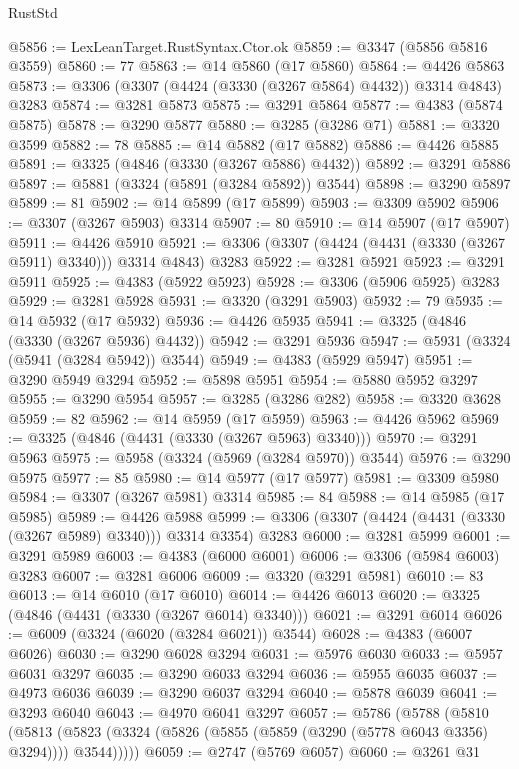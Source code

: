 \begin{lexlean}{RustStd}
\begin{coremodule}
@5856 := LexLeanTarget.RustSyntax.Ctor.ok
@5859 := @3347 (@5856 @5816 @3559)
@5860 := 77
@5863 := @14 @5860 (@17 @5860)
@5864 := @4426 @5863
@5873 := @3306 (@3307 (@4424 (@3330 (@3267 @5864) @4432)) @3314 @4843) @3283
@5874 := @3281 @5873
@5875 := @3291 @5864
@5877 := @4383 (@5874 @5875)
@5878 := @3290 @5877
@5880 := @3285 (@3286 @71)
@5881 := @3320 @3599
@5882 := 78
@5885 := @14 @5882 (@17 @5882)
@5886 := @4426 @5885
@5891 := @3325 (@4846 (@3330 (@3267 @5886) @4432))
@5892 := @3291 @5886
@5897 := @5881 (@3324 (@5891 (@3284 @5892)) @3544)
@5898 := @3290 @5897
@5899 := 81
@5902 := @14 @5899 (@17 @5899)
@5903 := @3309 @5902
@5906 := @3307 (@3267 @5903) @3314
@5907 := 80
@5910 := @14 @5907 (@17 @5907)
@5911 := @4426 @5910
@5921 := @3306 (@3307 (@4424 (@4431 (@3330 (@3267 @5911) @3340))) @3314 @4843) @3283
@5922 := @3281 @5921
@5923 := @3291 @5911
@5925 := @4383 (@5922 @5923)
@5928 := @3306 (@5906 @5925) @3283
@5929 := @3281 @5928
@5931 := @3320 (@3291 @5903)
@5932 := 79
@5935 := @14 @5932 (@17 @5932)
@5936 := @4426 @5935
@5941 := @3325 (@4846 (@3330 (@3267 @5936) @4432))
@5942 := @3291 @5936
@5947 := @5931 (@3324 (@5941 (@3284 @5942)) @3544)
@5949 := @4383 (@5929 @5947)
@5951 := @3290 @5949 @3294
@5952 := @5898 @5951
@5954 := @5880 @5952 @3297
@5955 := @3290 @5954
@5957 := @3285 (@3286 @282)
@5958 := @3320 @3628
@5959 := 82
@5962 := @14 @5959 (@17 @5959)
@5963 := @4426 @5962
@5969 := @3325 (@4846 (@4431 (@3330 (@3267 @5963) @3340)))
@5970 := @3291 @5963
@5975 := @5958 (@3324 (@5969 (@3284 @5970)) @3544)
@5976 := @3290 @5975
@5977 := 85
@5980 := @14 @5977 (@17 @5977)
@5981 := @3309 @5980
@5984 := @3307 (@3267 @5981) @3314
@5985 := 84
@5988 := @14 @5985 (@17 @5985)
@5989 := @4426 @5988
@5999 := @3306 (@3307 (@4424 (@4431 (@3330 (@3267 @5989) @3340))) @3314 @3354) @3283
@6000 := @3281 @5999
@6001 := @3291 @5989
@6003 := @4383 (@6000 @6001)
@6006 := @3306 (@5984 @6003) @3283
@6007 := @3281 @6006
@6009 := @3320 (@3291 @5981)
@6010 := 83
@6013 := @14 @6010 (@17 @6010)
@6014 := @4426 @6013
@6020 := @3325 (@4846 (@4431 (@3330 (@3267 @6014) @3340)))
@6021 := @3291 @6014
@6026 := @6009 (@3324 (@6020 (@3284 @6021)) @3544)
@6028 := @4383 (@6007 @6026)
@6030 := @3290 @6028 @3294
@6031 := @5976 @6030
@6033 := @5957 @6031 @3297
@6035 := @3290 @6033 @3294
@6036 := @5955 @6035
@6037 := @4973 @6036
@6039 := @3290 @6037 @3294
@6040 := @5878 @6039
@6041 := @3293 @6040
@6043 := @4970 @6041 @3297
@6057 := @5786
    (@5788
      (@5810
        (@5813 (@5823 (@3324 (@5826 (@5855 (@5859 (@3290 (@5778 @6043 @3356) @3294)))) @3544)))))
@6059 := @2747 (@5769 @6057)
@6060 := @3261 @31

\end{coremodule}
\end{lexlean}
